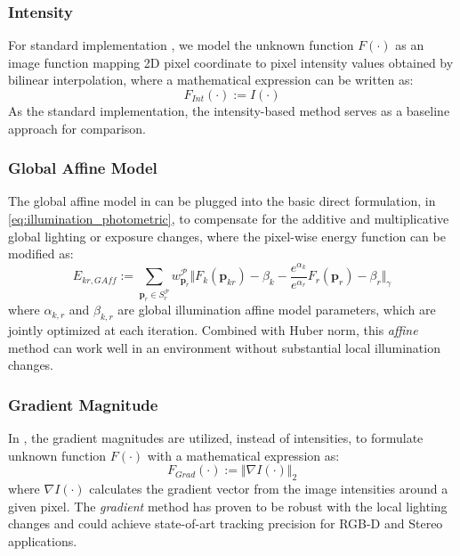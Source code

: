 \subsubsection{Intensity}
For standard implementation \cite{engel2018direct}, we model the unknown function $F(\cdot)$ as an image function mapping 2D pixel coordinate to pixel intensity values obtained by bilinear interpolation, where a mathematical expression can be written as:
\begin{equation} \label{eq:illumination_intensity}
F_{Int}(\cdot) := I(\cdot)
\end{equation}
As the standard implementation, the intensity-based method serves as a baseline approach for comparison.

\subsubsection{Global Affine Model}
The global affine model in \cite{klose2013efficient} \cite{engel2015large} can be plugged into the basic direct formulation, in \ref{eq:illumination_photometric}, to compensate for the additive and multiplicative global lighting or exposure changes, where the pixel-wise energy function can be modified as: 
\begin{equation} \label{eq:illumination_affine}
E_{kr,GAff} :=  \sum_{\mathbf{p}_r \in \mathit{S}_r^{\mathcal{P}}} w_{\mathbf{p}_r}^{\mathcal{P}} \Vert F_{k} ( \mathbf{p}_{kr})  - \beta_k - \frac{e^{\alpha_k}}{e^{\alpha_r}} F_{r}(\mathbf{p}_r) - \beta_r \Vert_{\gamma}  
\end{equation}
where $\alpha_{k,r}$ and $\beta_{k,r}$ are global illumination affine model parameters, which are jointly optimized at each iteration. Combined with Huber norm, this {\em affine} method can work well in an environment without substantial local illumination changes.

\subsubsection{Gradient Magnitude}
In \cite{dai2017bundlefusion}, the gradient magnitudes are utilized, instead of intensities, to formulate unknown function $F(\cdot)$ with a mathematical expression as:
\begin{equation} \label{eq:illumination_gradient}
F_{Grad}(\cdot) :=  \Vert \nabla I(\cdot)\Vert_{2}
\end{equation}
where $\nabla I(\cdot)$ calculates the gradient vector from the image intensities around a given pixel. The {\em gradient} method has proven to be robust with the local lighting changes and could achieve state-of-art tracking precision for RGB-D and Stereo applications. 

